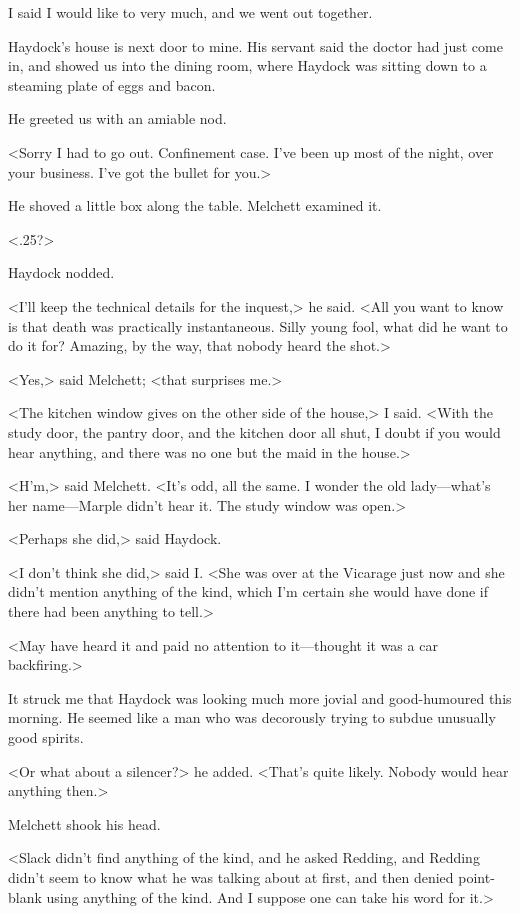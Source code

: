 I said I would like to very much, and we went out together.

Haydock's house is next door to mine. His servant said the doctor had just come in, and showed us into the dining room, where Haydock was sitting down to a steaming plate of eggs and bacon.

He greeted us with an amiable nod.

<Sorry I had to go out. Confinement case. I've been up most of the night, over your business. I've got the bullet for you.>

He shoved a little box along the table. Melchett examined it.

<.25?>

Haydock nodded.

<I'll keep the technical details for the inquest,> he said. <All you want to know is that death was practically instantaneous. Silly young fool, what did he want to do it for? Amazing, by the way, that nobody heard the shot.>

<Yes,> said Melchett; <that surprises me.>

<The kitchen window gives on the other side of the house,> I said. <With the study door, the pantry door, and the kitchen door all shut, I doubt if you would hear anything, and there was no one but the maid in the house.>

<H'm,> said Melchett. <It's odd, all the same. I wonder the old lady—what's her name—Marple didn't hear it. The study window was open.>

<Perhaps she did,> said Haydock.

<I don't think she did,> said I. <She was over at the Vicarage just now and she didn't mention anything of the kind, which I'm certain she would have done if there had been anything to tell.>

<May have heard it and paid no attention to it—thought it was a car backfiring.>

It struck me that Haydock was looking much more jovial and good-humoured this morning. He seemed like a man who was decorously trying to subdue unusually good spirits.

<Or what about a silencer?> he added. <That's quite likely. Nobody would hear anything then.>

Melchett shook his head.

<Slack didn't find anything of the kind, and he asked Redding, and Redding didn't seem to know what he was talking about at first, and then denied point-blank using anything of the kind. And I suppose one can take his word for it.>

